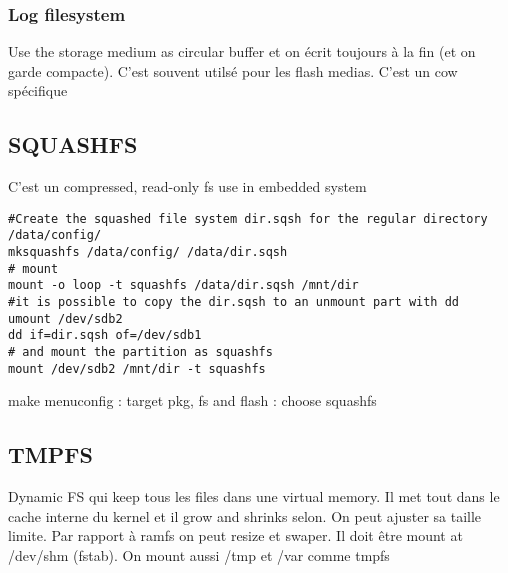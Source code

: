 \subsubsection{Log filesystem}
Use the storage medium as circular buffer et on écrit toujours à la fin (et on garde compacte). C'est souvent utilsé pour les flash medias. C'est un cow spécifique
\subsection{SQUASHFS}
C'est un compressed, read-only fs use in embedded system
\begin{lstlisting}[style=bash]
#Create the squashed file system dir.sqsh for the regular directory /data/config/
mksquashfs /data/config/ /data/dir.sqsh
# mount
mount -o loop -t squashfs /data/dir.sqsh /mnt/dir
#it is possible to copy the dir.sqsh to an unmount part with dd
umount /dev/sdb2
dd if=dir.sqsh of=/dev/sdb1
# and mount the partition as squashfs
mount /dev/sdb2 /mnt/dir -t squashfs
\end{lstlisting}
make menuconfig : target pkg, fs and flash : choose squashfs
\subsection{TMPFS}
Dynamic FS qui keep tous les files dans une virtual memory. Il met tout dans le cache interne du kernel et il grow and shrinks selon. On peut ajuster sa taille limite. Par rapport à ramfs on peut resize et swaper. Il doit être mount at /dev/shm (fstab). On mount aussi /tmp et /var comme tmpfs
